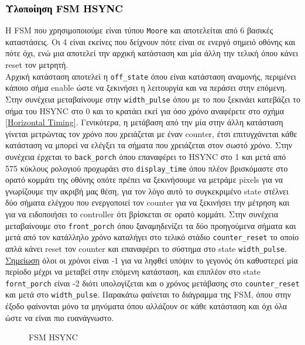 \documentclass[12pt,a4paper]{article}
\begin{document}
	\subsubsection{\textcolor{black}{Υλοποίηση FSM HSYNC} }
	Η FSM που χρησιμοποιούμε είναι τύπου \verb*|Moore| και αποτελείται από 6 βασικές καταστάσεις. Οι 4 είναι εκείνες που δείχνουν πότε είναι σε ενεργό σημειό οθόνης και πότε όχι, ενώ μια αποτελεί την αρχική κατάσταση και μία άλλη την τελική όπου κάνει reset τον μετρητή.\\
	Αρχική κατάσταση αποτελεί η \verb*|off_state| όπου είναι κατάσταση αναμονής, περιμένει κάποιο σήμα enable ώστε να ξεκινήσει η λειτουργία και να περάσει στην επόμενη. Στην συνέχεια μεταβαίνουμε στην \verb*|width_pulse| όπου με το που ξεκινάει κατεβάζει το σήμα του HSYNC στο 0 και το κρατάει εκεί για όσο χρόνο αναφέρετε στο σχήμα \ref{Horizontal Timing}. Γενικότερα, η μετάβαση από την μία στην άλλη κατάσταση γίνεται μετρώντας τον χρόνο που χρειάζεται με έναν counter, έτσι επιτυγχάνεται κάθε κατάσταση να μπορεί να ελέγξει τα σήματα που χρειάζεται στον σωστό χρόνο. Στην συνέχεια έρχεται το \verb*|back_porch| όπου επαναφέρει το HSYNC στο 1 και μετά από 575 κύκλους ρολογιού προχωράει στο \verb*|display_time| όπου πλέον βρισκόμαστε στο ορατό κομμάτι της οθόνης οπότε πρέπει να ξεκινήσουμε να μετράμε pixels για να γνωρίζουμε την ακριβή μας θέση, για τον λόγο αυτό το συγκεκριμένο state στέλνει δύο σήματα ελέγχου που ενεργοποιεί τον counter για να ξεκινήσει την μέτρηση και για να ειδοποιήσει το controller ότι βρίσκεται σε ορατό κομμάτι. Στην συνέχεια μεταβαίνουμε στο \verb*|front_porch| όπου ξαναμηδενίζει τα δύο προηγούμενα σήματα και μετά από τον κατάλληλο χρόνο καταλήγει στο τελικό στάδιο \verb*|counter_reset| το οποίο απλά κάνει reset τον counter και επαναφέρει το σύστημα στο state \verb*|width_pulse|.\\
	\underline{Σημείωση} όλοι οι χρόνοι είναι -1 για να ληφθεί υπόψιν το γεγονός ότι καθυστερεί μία περίοδο μέχρι να μεταβεί στην επόμενη κατάσταση, και επιπλέον στο state \verb*|fornt_porch| είναι -2 διότι υπολογίζεται και ο χρόνος μετάβασης στο \verb*|counter_reset| και μετά στο \verb*|width_pulse|.
	Παρακάτω φαίνεται το διάγραμμα της FSM, όπου στην έξοδο φαίνονται μόνο τα μηνύματα όπου αλλάζουν σε κάθε κατάσταση και όχι όλα ώστε να είναι πιο ευανάγνωστο.
	\begin{figure} [htbp]
		\caption{FSM HSYNC}
		\label{FSM HSYNC}
	\end{figure}
	
\end{document}
